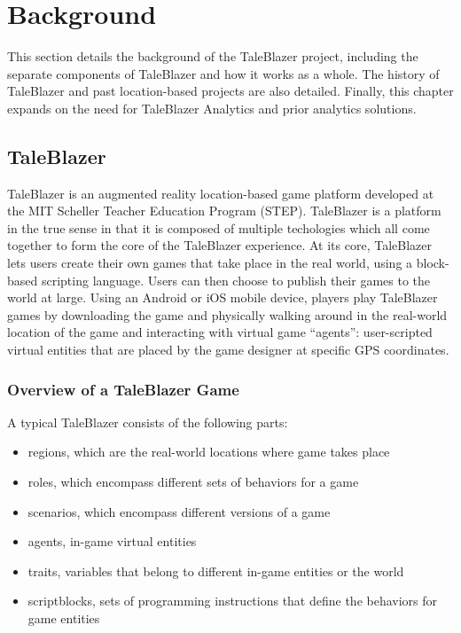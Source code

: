 \chapter{Background}

This section details the background of the TaleBlazer project, including the separate components of TaleBlazer and how it works as a whole. The history of TaleBlazer and past location-based projects are also detailed. Finally, this chapter expands on the need for TaleBlazer Analytics and prior analytics solutions. 

\section{TaleBlazer}

TaleBlazer is an augmented reality location-based game platform developed at the MIT Scheller Teacher Education Program (STEP). TaleBlazer is a platform in the true sense in that it is composed of multiple techologies which all come together to form the core of the TaleBlazer experience. At its core, TaleBlazer lets users create their own games that take place in the real world, using a block-based scripting language. Users can then choose to publish their games to the world at large. Using an Android or iOS mobile device, players play TaleBlazer games by downloading the game and physically walking around in the real-world location of the game and interacting with virtual game ``agents'': user-scripted virtual entities that are placed by the game designer at specific GPS coordinates.

\subsection{Overview of a TaleBlazer Game}

A typical TaleBlazer consists of the following parts: 
	\begin{itemize}
		\item regions, which are the real-world locations where game takes place
		\item roles, which encompass different sets of behaviors for a game
		\item scenarios, which encompass different versions of a game
		\item agents, in-game virtual entities
		\item traits, variables that belong to different in-game entities or the world
		\item scriptblocks, sets of programming instructions that define the behaviors for game entities
	\end{itemize}

